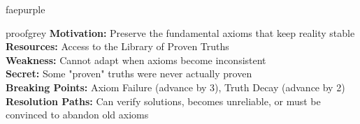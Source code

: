 \documentclass[11pt]{article}
\begin{document}
\begin{campaignsection}{faepurple}
\begin{npcbox}{proofgrey}
\textbf{Motivation:} Preserve the fundamental axioms that keep reality stable\\
\textbf{Resources:} Access to the Library of Proven Truths\\
\textbf{Weakness:} Cannot adapt when axioms become inconsistent\\
\textbf{Secret:} Some "proven" truths were never actually proven\\
\textbf{Breaking Points:} Axiom Failure (advance by 3), Truth Decay (advance by 2)\\
\textbf{Resolution Paths:} Can verify solutions, becomes unreliable, or must be convinced to abandon old axioms
\end{npcbox}
\end{campaignsection}

\newpage
\end{document}
